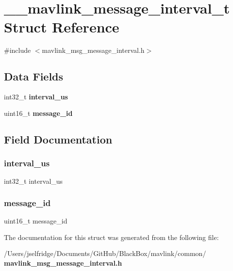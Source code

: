 \section{\+\_\+\+\_\+mavlink\+\_\+message\+\_\+interval\+\_\+t Struct Reference}
\label{struct____mavlink__message__interval__t}


{\ttfamily \#include $<$mavlink\+\_\+msg\+\_\+message\+\_\+interval.\+h$>$}

\subsection*{Data Fields}
\begin{DoxyCompactItemize}
\item 
int32\+\_\+t \textbf{ interval\+\_\+us}
\item 
uint16\+\_\+t \textbf{ message\+\_\+id}
\end{DoxyCompactItemize}


\subsection{Field Documentation}
\mbox{\label{struct____mavlink__message__interval__t_a4af85939cffb189fc3270afd9d2c53f1}} 
\subsubsection{interval\+\_\+us}
{\footnotesize\ttfamily int32\+\_\+t interval\+\_\+us}

\mbox{\label{struct____mavlink__message__interval__t_aa9c217c6e58cdb2408e2ffbe9425289d}} 
\subsubsection{message\+\_\+id}
{\footnotesize\ttfamily uint16\+\_\+t message\+\_\+id}



The documentation for this struct was generated from the following file\+:\begin{DoxyCompactItemize}
\item 
/\+Users/jselfridge/\+Documents/\+Git\+Hub/\+Black\+Box/mavlink/common/\textbf{ mavlink\+\_\+msg\+\_\+message\+\_\+interval.\+h}\end{DoxyCompactItemize}
